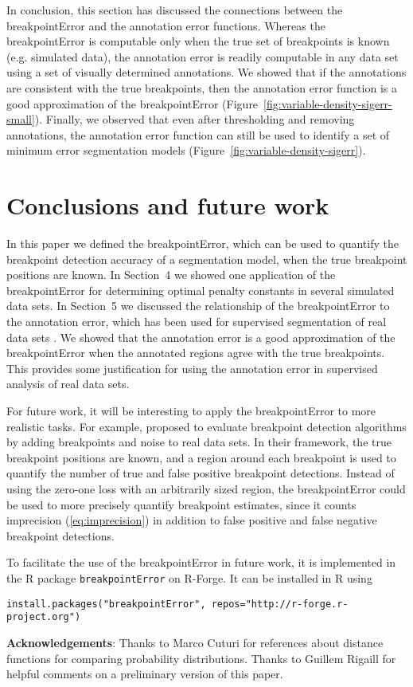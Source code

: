 \documentclass{article}
\begin{document}
In conclusion, this section has discussed the connections between the
breakpointError and the annotation error functions. Whereas the
breakpointError is computable only when the true set of breakpoints is
known (e.g. simulated data), the annotation error is readily
computable in any data set using a set of visually determined
annotations. We showed that if the annotations are consistent with the
true breakpoints, then the annotation error function is a good
approximation of the breakpointError
(Figure~\ref{fig:variable-density-sigerr-small}). Finally, we observed
that even after thresholding and removing annotations, the annotation
error function can still be used to identify a set of minimum error
segmentation models (Figure~\ref{fig:variable-density-sigerr}).


\section{Conclusions and future work}

In this paper we defined the breakpointError, which can be used to
quantify the breakpoint detection accuracy of a segmentation model,
when the true breakpoint positions are known. In Section~4 we showed
one application of the breakpointError for determining optimal penalty
constants in several simulated data sets. In Section~5 we discussed
the relationship of the breakpointError to the annotation error, which
has been used for supervised segmentation of real data sets
\citep{HOCKING-breakpoints, HOCKING-penalties, SegAnnDB}. We showed
that the annotation error is a good approximation of the
breakpointError when the annotated regions agree with the true
breakpoints. This provides some justification for using the annotation
error in supervised analysis of real data sets.

For future work, it will be interesting to apply the breakpointError
to more realistic tasks. For example, \citet{perf-eval-framework}
proposed to evaluate breakpoint detection algorithms by adding
breakpoints and noise to real data sets. In their framework, the true
breakpoint positions are known, and a region around each breakpoint is
used to quantify the number of true and false positive breakpoint
detections. Instead of using the zero-one loss with an arbitrarily
sized region, the breakpointError could be used to more precisely
quantify breakpoint estimates, since it counts imprecision
(\ref{eq:imprecision}) in addition to false positive and false
negative breakpoint detections.

To facilitate the use of the breakpointError in future work, it is
implemented in the R package \verb|breakpointError| on R-Forge. It can
be installed in R using

\begin{verbatim}
install.packages("breakpointError", repos="http://r-forge.r-project.org")
\end{verbatim}

\textbf{Acknowledgements}: Thanks to Marco Cuturi for references about
distance functions for comparing probability distributions. Thanks to
Guillem Rigaill for helpful comments on a preliminary version of this
paper.



\end{document}
